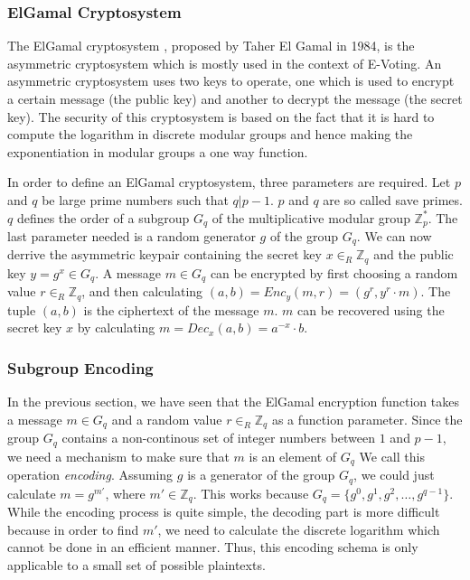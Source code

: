 \documentclass[numbers=noenddot, abstract=on]{scrreprt}
\begin{document}
\subsubsection{ElGamal Cryptosystem}
\label{sec:elgamal}
The ElGamal cryptosystem \cite{EG84},
proposed by Taher El Gamal in 1984, is the asymmetric cryptosystem which is mostly used in the
context of E-Voting. An asymmetric cryptosystem uses two keys to operate, one
which is used to encrypt a certain message (the public key) and another to
decrypt the message (the secret key). The security of this cryptosystem is based
on the fact that it is hard to compute the logarithm in discrete modular groups
and hence making the exponentiation in modular groups a one way function. 

In order to define an ElGamal cryptosystem, three parameters are required. Let
$p$ and $q$ be large prime numbers such that $q|p-1$. $p$ and $q$ are so
called save primes. $q$ defines the order of a subgroup $G_q$ of the
multiplicative modular group $\mathbb{Z}^*_p$. The last parameter needed is a random generator
$g$ of the group $G_q$. We can now derrive the asymmetric keypair containing the
secret key $x \in_R \mathbb{Z}_q$ and the public key $y=g^x \in G_q$. A message
$m \in G_q$ can be encrypted by first choosing a random value $r \in_R
\mathbb{Z}_q$, and then calculating $(a, b)=Enc_y(m, r)=(g^r, y^r \cdot m)$. The
tuple $(a, b)$ is the ciphertext of the message $m$. $m$ can be recovered using the secret key $x$
by calculating $m=Dec_x(a, b)=a^{-x} \cdot b$.

\subsubsection{Subgroup Encoding}
\label{sec:subgroupencoding}
In the previous section, we have seen that the ElGamal encryption function takes
a message $m \in G_q$ and a random value $r \in_R \mathbb{Z}_q$ as a function
parameter. Since the group $G_q$ contains a non-continous set of integer numbers
between $1$ and $p-1$, we need a mechanism to make sure that $m$ is an element
of $G_q$ We call this operation \textit{encoding}.
Assuming $g$ is a generator of the group $G_q$, we could just calculate
$m=g^{m'}$, where $m' \in \mathbb{Z}_q$. This works because $G_q = \{g^0, g^1,
g^2, \ldots, g^{q-1}\}$. While the encoding process is quite simple, the
decoding part is more difficult because in order to find $m'$, we need to
calculate the discrete logarithm which cannot be done in an efficient manner.
Thus, this encoding schema is only applicable to a small set of possible
plaintexts.
\end{document}
